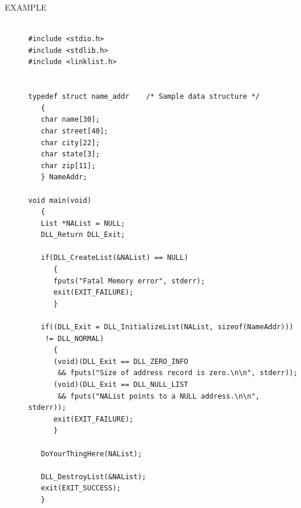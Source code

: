 \documentclass[10pt,letterpaper,titlepage]{article}
\begin{document}
\begin{description}
\item[EXAMPLE]
\small
\begin{verbatim}

#include <stdio.h>
#include <stdlib.h>
#include <linklist.h>


typedef struct name_addr    /* Sample data structure */
   {
   char name[30];
   char street[40];
   char city[22];
   char state[3];
   char zip[11];
   } NameAddr;

void main(void)
   {
   List *NAList = NULL;
   DLL_Return DLL_Exit;

   if(DLL_CreateList(&NAList) == NULL)
      {
      fputs("Fatal Memory error", stderr);
      exit(EXIT_FAILURE);
      }

   if((DLL_Exit = DLL_InitializeList(NAList, sizeof(NameAddr)))
    != DLL_NORMAL)
      {
      (void)(DLL_Exit == DLL_ZERO_INFO
       && fputs("Size of address record is zero.\n\n", stderr));
      (void)(DLL_Exit == DLL_NULL_LIST
       && fputs("NAList points to a NULL address.\n\n", stderr));
      exit(EXIT_FAILURE);
      }

   DoYourThingHere(NAList);

   DLL_DestroyList(&NAList);
   exit(EXIT_SUCCESS);
   }
\end{verbatim}
\normalsize

\end{description}
\newpage
\end{document}
